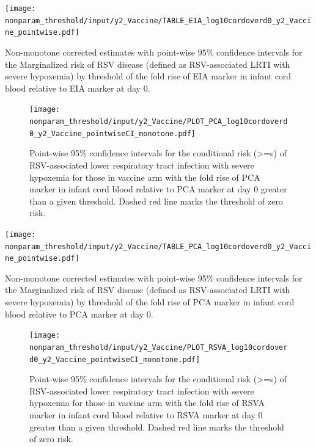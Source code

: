 \documentclass[11pt]{article}
\begin{document}
\begin{table}[H]
    \centering
    \texttt{[image: nonparam\_threshold/input/y2\_Vaccine/TABLE\_EIA\_log10cordoverd0\_y2\_Vaccine\_pointwise.pdf]}
  \caption{Non-monotone corrected estimates with point-wise 95\% confidence intervals for the Marginalized risk of RSV disease (defined as RSV-associated LRTI with severe hypoxemia) by threshold of the fold rise of EIA marker in infant cord blood relative to EIA marker at day 0. }
  \label{tab:TABLE_EIA_log10cordoverd0_y2_Vaccine_pointwise}
\end{table}

\begin{figure}[H]
    \centering
    \texttt{[image: nonparam\_threshold/input/y2\_Vaccine/PLOT\_PCA\_log10cordoverd0\_y2\_Vaccine\_pointwiseCI\_monotone.pdf]}
   \caption{Point-wise 95\% confidence intervals for the conditional risk (>=s) of RSV-associated lower respiratory tract infection with severe hypoxemia for those in vaccine arm with the fold rise of PCA marker in infant cord blood relative to PCA marker at day 0 greater than a given threshold. Dashed red line marks the threshold of zero risk.}
   \label{tab:PLOT_PCA_log10cordoverd0_y2_Vaccine_pointwise_monotone}
\end{figure}

\begin{table}[H]
    \centering
    \texttt{[image: nonparam\_threshold/input/y2\_Vaccine/TABLE\_PCA\_log10cordoverd0\_y2\_Vaccine\_pointwise.pdf]}
  \caption{Non-monotone corrected estimates with point-wise 95\% confidence intervals for the Marginalized risk of RSV disease (defined as RSV-associated LRTI with severe hypoxemia) by threshold of the fold rise of PCA marker in infant cord blood relative to PCA marker at day 0. }
     \label{tab:TABLE_PCA_log10cordoverd0_y2_Vaccine_pointwise}
\end{table}

\begin{figure}[H]
    \centering
    \texttt{[image: nonparam\_threshold/input/y2\_Vaccine/PLOT\_RSVA\_log10cordoverd0\_y2\_Vaccine\_pointwiseCI\_monotone.pdf]}
   \caption{Point-wise 95\% confidence intervals for the conditional risk (>=s) of RSV-associated lower respiratory tract infection with severe hypoxemia for those in vaccine arm with the fold rise of RSVA marker in infant cord blood relative to RSVA marker at day 0 greater than a given threshold. Dashed red line marks the threshold of zero risk.}
      \label{tab:PLOT_RSVA_log10cordoverd0_y2_Vaccine_pointwise_monotone}
\end{figure}
\end{document}
